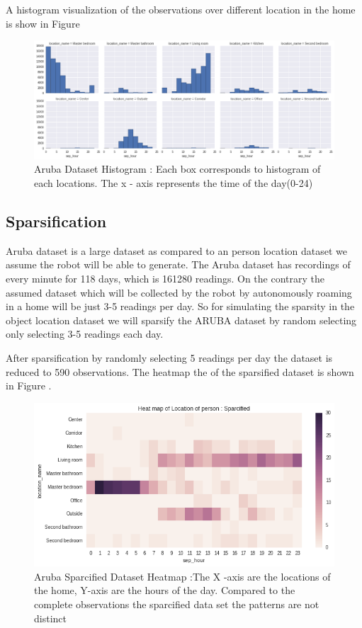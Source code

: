 A histogram visualization of the observations over different location in the home is show in Figure \cite{aruba-hist}

\begin{figure}[htp]
\centering
\includegraphics[width=\textwidth]{images/aruba-hist.png}
\caption{Aruba Dataset Histogram : Each box corresponds to histogram of each locations. The x - axis represents the time of the day(0-24) }
\label{aruba-hist}
\end{figure}


\subsection*{Sparsification}
Aruba dataset is a large dataset as compared to an person location dataset we assume the robot will be able to generate. The Aruba dataset has recordings of every minute for 118 days, which is 161280 readings.
On the contrary the assumed dataset which will be collected by the robot by autonomously roaming in a home will be just 3-5 readings per day.
So for simulating the sparsity in the object location dataset we will sparsify the ARUBA dataset by random selecting only selecting 3-5 readings each day.

After sparsification by randomly selecting 5 readings per day the dataset is reduced to 590 observations. The heatmap the of the sparsified dataset is shown in Figure \cite{aruba-reduced-hist}. 

\begin{figure}[htp]
\centering
\includegraphics[width=\textwidth]{images/aruba-reduced-heatmap.png}
\caption{Aruba Sparcified Dataset Heatmap :The X -axis are the locations of the home, Y-axis are the hours of the day. Compared to the complete observations the sparcified data set the patterns are not distinct}
\label{aruba-reduced-hist}
\end{figure}

